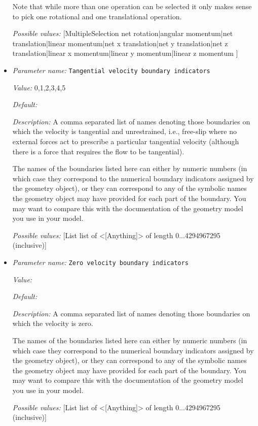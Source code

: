 \begin{itemize}
Note that while more than one operation can be selected it only makes sense to pick one rotational and one translational operation.


{\it Possible values:} [MultipleSelection net rotation|angular momentum|net translation|linear momentum|net x translation|net y translation|net z translation|linear x momentum|linear y momentum|linear z momentum ]
\item {\it Parameter name:} {\tt Tangential velocity boundary indicators}
\label{parameters:Model settings/Tangential velocity boundary indicators}


{\it Value:} 0,1,2,3,4,5


{\it Default:} 


{\it Description:} A comma separated list of names denoting those boundaries on which the velocity is tangential and unrestrained, i.e., free-slip where no external forces act to prescribe a particular tangential velocity (although there is a force that requires the flow to be tangential).

The names of the boundaries listed here can either by numeric numbers (in which case they correspond to the numerical boundary indicators assigned by the geometry object), or they can correspond to any of the symbolic names the geometry object may have provided for each part of the boundary. You may want to compare this with the documentation of the geometry model you use in your model.


{\it Possible values:} [List list of <[Anything]> of length 0...4294967295 (inclusive)]
\item {\it Parameter name:} {\tt Zero velocity boundary indicators}
\label{parameters:Model settings/Zero velocity boundary indicators}


{\it Value:} 


{\it Default:} 


{\it Description:} A comma separated list of names denoting those boundaries on which the velocity is zero.

The names of the boundaries listed here can either by numeric numbers (in which case they correspond to the numerical boundary indicators assigned by the geometry object), or they can correspond to any of the symbolic names the geometry object may have provided for each part of the boundary. You may want to compare this with the documentation of the geometry model you use in your model.


{\it Possible values:} [List list of <[Anything]> of length 0...4294967295 (inclusive)]
\end{itemize}


